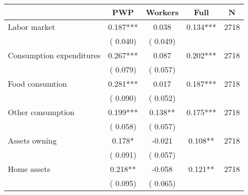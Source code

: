 
\begin{tabular}{l*{4}{c}}\hline&\multicolumn{1}{c}{PWP}&\multicolumn{1}{c}{Workers}&\multicolumn{1}{c}{Full}&\multicolumn{1}{c}{N} \\ \hline

 Labor market &              0.187*** &         0.038 &           0.134*** & 2718                       \\  
                 &        (       0.040)                   &        (       0.049)                        &                                                             &                                                      \\      

 Consumption expenditures &              0.267*** &         0.087 &           0.202*** & 2718                       \\  
                 &        (       0.079)                   &        (       0.057)                        &                                                             &                                                      \\      

 Food consumtion &              0.281*** &         0.017 &           0.187*** & 2718                       \\  
                 &        (       0.090)                   &        (       0.052)                        &                                                             &                                                      \\      

 Other consumption &              0.199*** &         0.138** &           0.175*** & 2718                       \\  
                 &        (       0.058)                   &        (       0.057)                        &                                                             &                                                      \\      

 Assets owning &              0.178* &        -0.021 &           0.108** & 2718                       \\  
                 &        (       0.091)                   &        (       0.057)                        &                                                             &                                                      \\      

 Home assets &              0.218** &        -0.058 &           0.121** & 2718                       \\  
                 &        (       0.095)                   &        (       0.065)                        &                                                             &                                                      \\      


\end{tabular}
